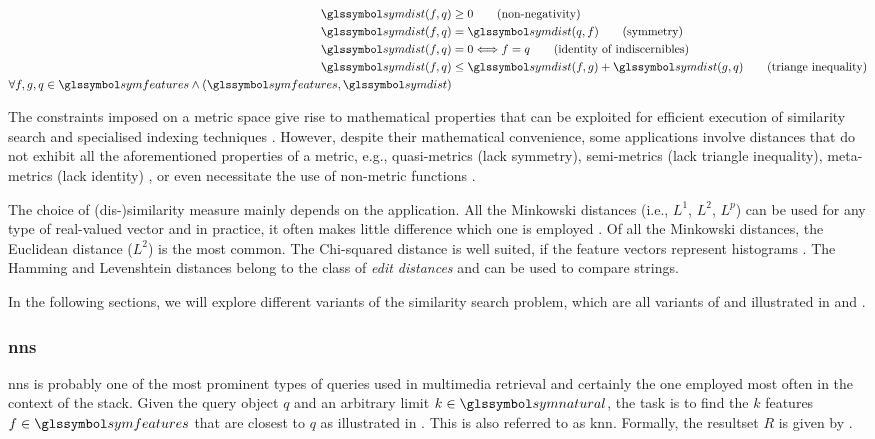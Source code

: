 \begin{align}
  \label{eq:metric}
   \symdist(f,q) &\geq 0                           \tag{non-negativity} \\
   \symdist(f,q) &= \symdist(q,f)                    \tag{symmetry}\\
   \symdist(f,q) &= 0 \Longleftrightarrow f = q    \tag{identity of indiscernibles}\\
   \symdist(f,q) &\leq  \symdist(f,g) +  \symdist(g,q)   \tag{triange inequality}\\
   \forall f,g,q \in \symfeatures \wedge (\symfeatures, \symdist) \nonumber
\end{align}

The constraints imposed on a metric space give rise to mathematical properties that can be exploited for efficient execution of similarity search and specialised indexing techniques \cite{Zezula:2006Similarity}. However, despite their mathematical convenience, some applications involve distances that do not exhibit all the aforementioned properties of a metric, e.g., quasi-metrics (lack symmetry), semi-metrics (lack triangle inequality), meta-metrics (lack identity) \cite{Zezula:2006Similarity}, or even necessitate the use of non-metric functions \cite{Skopal:2011Nonmetric}.

The choice of (dis-)similarity measure mainly depends on the application. All the Minkowski distances (i.e., $L^1$, $L^2$, $L^p$) can be used for any type of real-valued vector and in practice, it often makes little difference which one is employed \cite{Rossetto:2018Multi}. Of all the Minkowski distances, the Euclidean distance ($L^2$) is the most common. The Chi-squared distance is well suited, if the feature vectors represent histograms \cite{Pele:2010Quadratic}. The Hamming and Levenshtein \cite{Levensthtein:1965Binary} distances belong to the class of \emph{edit distances} and can be used to compare strings.

In the following sections, we will explore different variants of the similarity search problem, which are all variants of  and illustrated in  and .

\subsubsection{\texorpdfstring{\acrfull{nns}}{Nearest Neighbour Search (NNS)}}

\acrshort{nns} is probably one of the most prominent types of queries used in multimedia retrieval and certainly the one employed most often in the context of the \vitrivr{} \cite{Rossetto:2016Vitrivr,Gasser:2019Multimodal} stack. Given the query object $q$ and an arbitrary limit $k \in \symnatural$, the task is to find the $k$ features $f \in \symfeatures$ that are closest to $q$ as illustrated in . This is also referred to as \acrfull{knn}. Formally, the resultset $R$ is given by .

